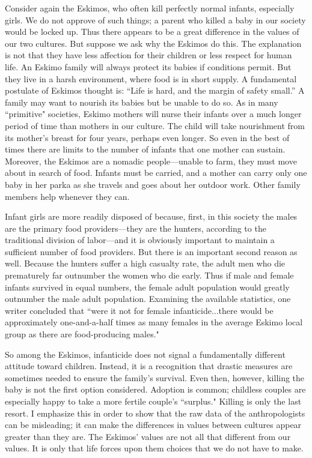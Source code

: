 Consider  again the  Eskimos,  who  often  kill  perfectly  normal  infants, 
especially girls. We do not approve of such things; a parent who killed a 
baby  in  our  society  would  be  locked  up.  Thus  there  appears  to  be  a 
great  difference  in  the  values  of  our  two  cultures.  But  suppose  we  ask 
why  the  Eskimos  do  this.  The  explanation  is  not  that  they  have  less 
affection  for  their  children  or  less  respect  for  human  life.  An  Eskimo 
family will always protect its babies if conditions permit. But they live in a 
harsh environment, where food is in short supply. A fundamental 
postulate  of  Eskimos  thought  is:  ``Life  is  hard,  and  the  margin  of  safety 
small.” A family may want to nourish its babies but be unable to do so. 
As  in many ``primitive" societies,  Eskimo mothers will nurse  their  infants 
over a much longer period of time than mothers in our culture. The child 
will  take  nourishment  from  its  mother's  breast  for  four  years,  perhaps 
even longer. So even in the best of times there are limits to the number 
of  infants  that  one  mother  can  sustain.  Moreover,  the  Eskimos  are  a 
nomadic  people—unable  to  farm,  they  must  move  about  in  search  of 
food.  Infants  must  be carried,  and  a  mother  can  carry only  one  baby in 
her parka as she travels and goes about her outdoor work. Other family 
members help whenever they can. 

Infant girls are more readily disposed of because, first, in this society the 
males are the primary food providers—they are the hunters, according to 
the traditional division of labor—and it is obviously important to maintain 
a  sufficient  number  of  food  providers.  But  there  is  an  important  second 
reason as well. Because the hunters suffer a high casualty rate, the adult 
men who die prematurely far outnumber the women who die early. Thus 
if  male  and  female  infants  survived  in  equal  numbers,  the  female  adult 
population would greatly outnumber the male adult population. 
Examining the available statistics, one writer concluded that ``were it not 
for female infanticide...there  would  be  approximately  one-and-a-half 
times  as  many  females  in  the  average Eskimo  local  group  as  there are 
food-producing males." 

So  among  the  Eskimos,  infanticide  does  not  signal  a  fundamentally 
different  attitude  toward  children.  Instead,  it  is  a  recognition  that  drastic 
measures  are  sometimes  needed  to  ensure  the  family's  survival.  Even 
then, however, killing the baby is not the first option considered. 
Adoption  is  common;  childless  couples  are  especially  happy  to  take  a 
more fertile couple's ``surplus." Killing is only the last resort. I emphasize 
this  in  order  to  show  that  the  raw  data  of  the  anthropologists  can  be 
misleading;  it  can  make  the  differences  in  values  between  cultures 
appear  greater  than  they  are.  The  Eskimos'  values  are  not  all  that 
different from our values. It is only that life forces upon them choices that 
we do not have to make. 

